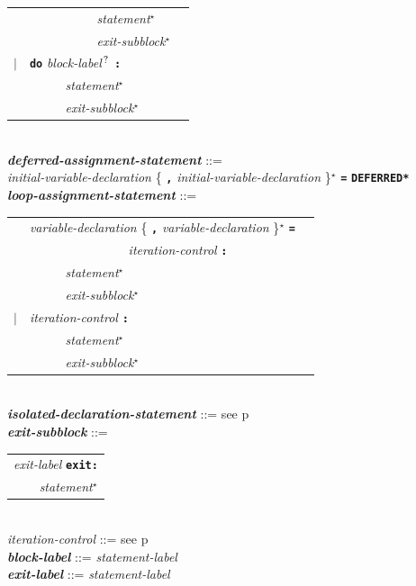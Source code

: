 \documentclass[12pt]{article}
\newcommand{\TT}[1]{{\tt \bfseries #1}}
\newcommand{\STAR}{{\Large $^\star$}}
\newcommand{\QMARK}{{$^{\,\mbox{\footnotesize ?}}$}}
\newcommand{\ttkey}[1]{{\tt \bfseries #1}}
\newcommand{\emkey}[1]{{\em \bfseries #1}}
\newcommand{\pagref}[1]{p\pageref{#1}}
\newenvironment{indpar}[1][0.3in]%
	{\begin{list}{}%
		     {\setlength{\itemsep}{0in}%
		      \setlength{\topsep}{0in}%
		      \setlength{\parsep}{1ex}%
		      \setlength{\labelwidth}{#1}%
		      \setlength{\leftmargin}{#1}%
		      \addtolength{\leftmargin}{\labelsep}}%
	 \item}%
	{\end{list}}
\begin{document}
\begin{indpar}
\begin{tabular}[t]{@{}rll}
        & ~~~~~~~~~~ {\em statement}\STAR{} \\
        & ~~~~~~~~~~ {\em exit-subblock}\STAR{} \\
    $|$ & \ttkey{do} {\em block-label}\QMARK{} \TT{:} \\
        & ~~~~~ {\em statement}\STAR{} \\
        & ~~~~~ {\em exit-subblock}\STAR{} \\
    \end{tabular}
\\[0.5ex]
\emkey{deferred-assignment-statement} ::= \\
\hspace*{0.5in}
        {\em initial-variable-declaration}
	    \{ \TT{,} {\em initial-variable-declaration} \}\STAR{}
	    \TT{=} \ttkey{*DEFERRED*}
\\[0.5ex]
\emkey{loop-assignment-statement} ::= \\
\hspace*{0.5in}
    \begin{tabular}[t]{@{}rll}
        & {\em variable-declaration}
                \{ \TT{,} {\em variable-declaration} \}\STAR{}
		\TT{=} \\
	& ~~~~~~~~~~~~~~~ {\em iteration-control} \TT{:} \\
        & ~~~~~ {\em statement}\STAR{} \\
        & ~~~~~ {\em exit-subblock}\STAR{} \\
    $|$ & {\em iteration-control} \TT{:} \\
        & ~~~~~ {\em statement}\STAR{} \\
        & ~~~~~ {\em exit-subblock}\STAR{} \\
    \end{tabular}
\\[0.5ex]
\emkey{isolated-declaration-statement} ::=
	see \pagref{ISOLATED-DECLARATION-STATEMENT}
\\[0.5ex]
\emkey{exit-subblock} ::=
    \begin{tabular}[t]{l}
    {\em exit-label} \ttkey{exit}\TT{:} \\
    \TT{~~~~}{\em statement}\STAR{} \\
    \end{tabular}
\\[0.5ex]
{\em iteration-control} ::= see \pagref{ITERATION-CONTROL}
\\[0.5ex]
\emkey{block-label}\label{BLOCK-LABEL} ::= {\em statement-label}
\\[0.5ex]
\emkey{exit-label} ::= {\em statement-label}

\end{indpar}
\end{document}
